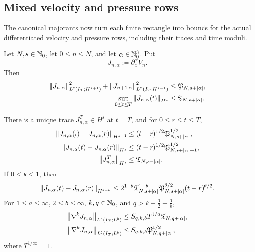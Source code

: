 \subsection{Mixed velocity and pressure rows}

The canonical majorants now turn each finite rectangle into bounds for the
actual differentiated velocity and pressure rows, including their traces and
time moduli.

\begin{theorem}
\label{f:thm:qc-mixed-jet}
\begin{samepage}
Let \(N,s\in\mathbb N_0\), let \(0\le n\le N\), and let
\(\alpha\in\mathbb N_0^3\).  Put
\[
 J_{n,\alpha}:=\partial_x^\alpha V_n.
\]
Then
\begin{align}
 \left\lVert J_{n,\alpha}\right\rVert_{L^2(I_T;H^{s+1})}^2
 +\left\lVert J_{n+1,\alpha}\right\rVert_{L^2(I_T;H^{s-1})}^2
 &\le \mathfrak P_{N,s+|\alpha|},
 \label{f:eq:qc-mixed-adjacent}\\
 \sup_{0\le t\le T}\left\lVert J_{n,\alpha}(t)\right\rVert_{H^s}
 &\le \mathfrak T_{N,s+|\alpha|}.
 \label{f:eq:qc-mixed-trace}
\end{align}
\end{samepage}
There is a unique trace \(J_{n,\alpha}^T\in H^s\) at \(t=T\), and
for \(0\le r\le t\le T\),
\begin{align}
 \left\lVert J_{n,\alpha}(t)-J_{n,\alpha}(r)\right\rVert_{H^{s-1}}
 &\le (t-r)^{1/2}\mathfrak P_{N,s+|\alpha|}^{1/2},
 \label{f:eq:qc-mixed-low-modulus}\\
 \left\lVert J_{n,\alpha}(t)-J_{n,\alpha}(r)\right\rVert_{H^s}
 &\le (t-r)^{1/2}
        \mathfrak P_{N,s+|\alpha|+1}^{1/2},
 \label{f:eq:qc-mixed-strong-modulus}\\
 \left\lVert J_{n,\alpha}^T\right\rVert_{H^s}
 &\le \mathfrak T_{N,s+|\alpha|}.
 \label{f:eq:qc-mixed-endpoint-size}
\end{align}
If \(0\le\theta\le1\), then
\begin{equation}
 \left\lVert J_{n,\alpha}(t)-J_{n,\alpha}(r)\right\rVert_{H^{s-\theta}}
 \le
 2^{1-\theta}
 \mathfrak T_{N,s+|\alpha|}^{1-\theta}
 \mathfrak P_{N,s+|\alpha|}^{\theta/2}
 (t-r)^{\theta/2}.
 \label{f:eq:qc-mixed-interpolated-modulus}
\end{equation}
For \(1\le a\le\infty\), \(2\le b\le\infty\),
\(k,q\in\mathbb N_0\), and
\(q>k+\frac32-\frac3b\),
\begin{align}
 \left\lVert \nabla^kJ_{n,\alpha}\right\rVert_{L^a(I_T;L^b)}
 &\le S_{q,k,b}T^{1/a}\mathfrak T_{N,q+|\alpha|},
 \label{f:eq:qc-mixed-la-lb}\\
 \left\lVert \nabla^kJ_{n,\alpha}\right\rVert_{L^2(I_T;L^b)}
 &\le S_{q,k,b}\mathfrak P_{N,q+|\alpha|}^{1/2},
 \label{f:eq:qc-mixed-l2-lb}
\end{align}
where \(T^{1/\infty}=1\).
\end{theorem}

